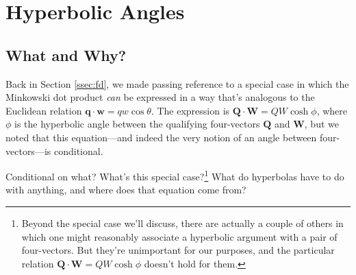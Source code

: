 \documentclass[12pt]{article}
\renewcommand{\vv}[1]{\mathbf{#1}}
\begin{document}
\section{Hyperbolic Angles}\label{sec:ra}

\subsection{What and Why?}

Back in Section \ref{ssec:fd}, we made passing reference to a special case in which the Minkowski dot product \emph{can} be expressed in a way that's analogous to the Euclidean relation $\vv q \cdot \vv w = qw \cos \theta$. The expression is $\vv Q \cdot \vv W = QW \cosh \phi$, where $\phi$ is the hyperbolic angle between the qualifying four-vectors $\vv Q$ and $\vv W$, but we noted that this equation---and indeed the very notion of an angle between four-vectors---is conditional.

Conditional on what? What's this special case?\footnote{Beyond the special case we'll discuss, there are actually a couple of others in which one might reasonably associate a hyperbolic argument with a pair of four-vectors. But they're unimportant for our purposes, and the particular relation $\vv Q \cdot \vv W = QW \cosh \phi$ doesn't hold for them.} What do hyperbolas have to do with anything, and where does that equation come from?
\end{document}
